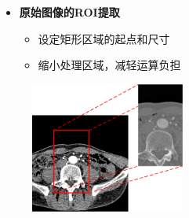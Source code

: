 \begin{frame}
\begin{itemize}
\item \textbf{原始图像的ROI提取}
\begin{itemize}
\pause \item 设定矩形区域的起点和尺寸
\pause \item 缩小处理区域，减轻运算负担
\end{itemize}
\end{itemize}
\begin{figure}[t]
\centering
\includegraphics[width=2.0in]{../../Figures/gac/ROI.eps}
\end{figure}
\end{frame}


